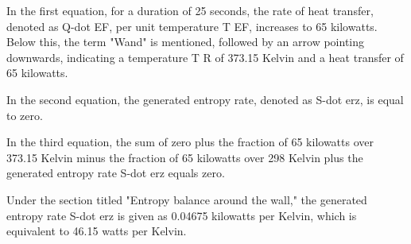 In the first equation, for a duration of 25 seconds, the rate of heat transfer, denoted as Q-dot EF, per unit temperature T EF, increases to 65 kilowatts. Below this, the term "Wand" is mentioned, followed by an arrow pointing downwards, indicating a temperature T R of 373.15 Kelvin and a heat transfer of 65 kilowatts.

In the second equation, the generated entropy rate, denoted as S-dot erz, is equal to zero.

In the third equation, the sum of zero plus the fraction of 65 kilowatts over 373.15 Kelvin minus the fraction of 65 kilowatts over 298 Kelvin plus the generated entropy rate S-dot erz equals zero.

Under the section titled "Entropy balance around the wall," the generated entropy rate S-dot erz is given as 0.04675 kilowatts per Kelvin, which is equivalent to 46.15 watts per Kelvin.